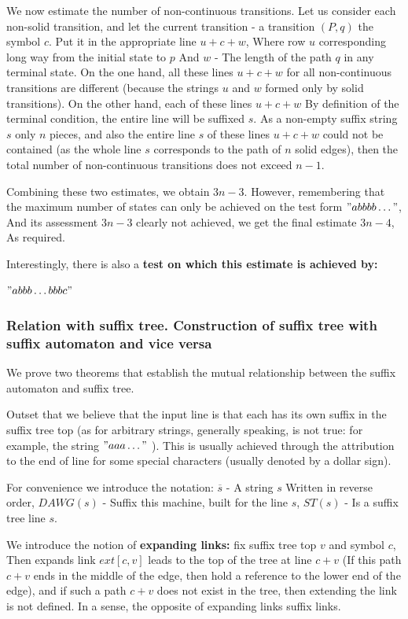 We now estimate the number of non-continuous transitions. Let us consider each non-solid transition, and let the current transition - a transition $(P, q)$ the symbol $c$. Put it in the appropriate line $u + c + w$, Where row $u$ corresponding long way from the initial state to $p$ And $w$ - The length of the path $q$ in any terminal state. On the one hand, all these lines $u + c + w$ for all non-continuous transitions are different (because the strings $u$ and $w$ formed only by solid transitions). On the other hand, each of these lines $u + c + w$ By definition of the terminal condition, the entire line will be suffixed $s$. As a non-empty suffix string $s$ only $n$ pieces, and also the entire line $s$ of these lines $u + c + w$ could not be contained (as the whole line $s$ corresponds to the path of $n$ solid edges), then the total number of non-continuous transitions does not exceed $n-1$.

Combining these two estimates, we obtain $3n-3$. However, remembering that the maximum number of states can only be achieved on the test form $" abbbb \ldots "$, And its assessment $3n-3$ clearly not achieved, we get the final estimate $3n-4$, As required.

Interestingly, there is also a \textbf{test on which this estimate is achieved by:}

$" abbb \ldots bbbc" $

\subsubsection{ Relation with suffix tree. Construction of suffix tree with suffix automaton and vice versa }

We prove two theorems that establish the mutual relationship between the suffix automaton and suffix tree.

Outset that we believe that the input line is that each has its own suffix in the suffix tree top (as for arbitrary strings, generally speaking, is not true: for example, the string $" aaa \ldots"$ ). This is usually achieved through the attribution to the end of line for some special characters (usually denoted by a dollar sign).

For convenience we introduce the notation: $\overline {s}$ - A string $s$ Written in reverse order, $DAWG (s)$ - Suffix this machine, built for the line $s$, $ST (s)$ - Is a suffix tree line $s$.

We introduce the notion of \textbf{expanding links:} fix suffix tree top $v$ and symbol $c$, Then expands link $ext [c, v]$ leads to the top of the tree at line $c + v$ (If this path $c + v$ ends in the middle of the edge, then hold a reference to the lower end of the edge), and if such a path $c + v$ does not exist in the tree, then extending the link is not defined. In a sense, the opposite of expanding links suffix links.


